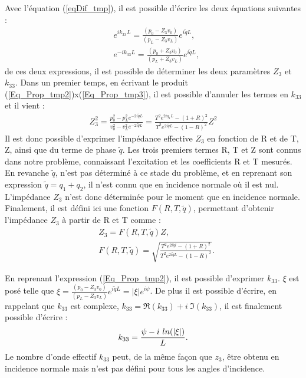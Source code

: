 \documentclass[12pt]{report}
\begin{document}
    Avec l'équation (\ref{eqDif_tmp}), il est possible d'écrire les deux équations suivantes :
    \begin{align}
        &e^{i k_{33}L}=\frac{(p_0-Z_3v_0)}{(p_L-Z_3v_L)}e^{i\tilde{q}L},\label{Eq_Prop_tmp2}\\
        &e^{-i k_{33}L}=\frac{(p_0+Z_3v_0)}{(p_L+Z_3v_L)}e^{i\tilde{q}L},\label{Eq_Prop_tmp3}
    \end{align}
    de ces deux expressions, il est possible de déterminer les deux paramètres $Z_3$ et $k_{33}$.
    Dans un premier temps, en écrivant le produit (\ref{Eq_Prop_tmp2})x(\ref{Eq_Prop_tmp3}), il est possible d'annuler les termes en $k_{33}$ et il vient : 
    \begin{align}
    Z_3^2=\frac{p_0^2-p_L^2e^{-2i\tilde{q}L}}{v_0^2-v_L^2e^{-2i\tilde{q}L}}=\frac{T^2e^{2iq_1L}-(1+R)^2}{T^2e^{2i\tilde{q}L}-(1-R)^2}Z^2\label{Z3_tmp}
    \end{align}
    Il est donc possible d'exprimer l'impédance effective $Z_3$ en fonction de R et de T, Z, ainsi que du terme de phase $\tilde{q}$. Les trois premiers termes R, T et Z sont connus dans notre problème, connaissant l'excitation et les coefficients R et T mesurés. En revanche $\tilde{q}$, n'est pas déterminé à ce stade du problème, et en reprenant son expression $\tilde{q}=q_1+q_2$, il n'est connu que en incidence normale où il est nul. L'impédance $Z_3$ n'est donc déterminée pour le moment que en incidence normale. Finalement, il est défini ici une fonction $F(R,T,\tilde{q})$, permettant d'obtenir l'impédance $Z_3$ à partir de R et T comme :
    \begin{align}
    &Z_3=F(R,T,\tilde{q})Z,\label{Z3}\\
    &F(R,T,\tilde{q})=\sqrt{\frac{T^2e^{2i\tilde{q}l}-(1+R)^2}{T^2e^{2i\tilde{q}L}-(1-R)^2}}.\label{F(R,T,q)}
    \end{align}

    
    En reprenant l'expression (\ref{Eq_Prop_tmp2}), il est possible d'exprimer $k_{33}$. $\xi$ est posé telle que $\xi=\frac{(p_0-Z_3v_0)}{(p_L-Z_3v_L)}e^{i\tilde{q}L}=|\xi|e^{i\psi}$. De plus il est possible d'écrire, en rappelant que $k_{33}$ est complexe, $k_{33}=\Re(k_{33})+i\ \Im(k_{33})$, il est finalement possible d'écrire :
     \begin{align}
        k_{33}=\frac{\psi-i\ ln(|\xi|)}{L}\label{k_{33}}.
    \end{align}
    Le nombre d'onde effectif $k_{33}$ peut, de la même façon que $z_3$, être obtenu en incidence normale mais n'est pas défini pour tous les angles d'incidence.
    
\end{document}
